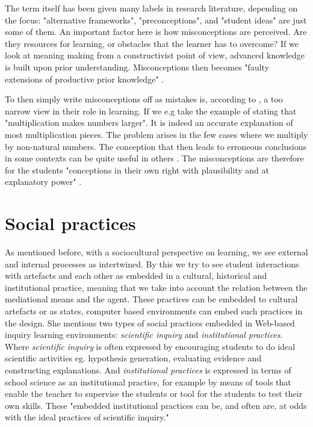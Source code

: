 The term itself has been given many labels in research literature, depending on the focus: "alternative frameworks", "preconceptions", and "student ideas" are just some of them. An important factor here is how misconceptions are perceived. Are they resources for learning, or obstacles that the learner has to overcome? If we look at meaning making from a constructivist point of view, advanced knowledge is built upon prior understanding. Misconceptions then becomes "faulty extensions of productive prior knowledge" \citep{smith1994misconceptions}.

To then simply write misconceptions off as mistakes is, according to \citet{smith1994misconceptions}, a too narrow view in their role in learning. If we e.g take the example of stating that "multiplication makes numbers larger". It is indeed an accurate explanation of most multiplication pieces. The problem arises in the few cases where we multiply by non-natural numbers. The conception that then leads to erroneous conclusions in some contexts can be quite useful in others \citep{smith1994misconceptions}. The misconceptions are therefore for the students "conceptions in their own right with plausibility and at explanatory power" \citetext{Smith, diSessa \& Roschelle 1993, referenced in \citealp{larkin2012misconceptions}}. 

\section{Social practices}
As mentioned before, with a sociocultural perspective on learning, we see external and internal processes as intertwined. By this we try to see student interactions with artefacts and each other as embedded in a cultural, historical and institutional practice, meaning that we take into account the relation between the mediational means and the agent. These practices can be embedded to cultural artefacts or as \citet{furberg2009socio} states, computer based environments can embed such practices in the design. She mentions two types of social practices embedded in Web-based inquiry learning environments: \emph{scientific inquiry} and \emph{institutional practices}.  Where \emph{scientific inquiry} is often expressed by encouraging students to do ideal scientific activities eg. hypothesis generation, evaluating evidence and constructing explanations. And \emph{institutional practices} is expressed in terms of school science as an institutional practice, for example by means of tools that enable the teacher to supervise the students or tool for the students to test their own skills. These "embedded institutional practices can be, and often are, at odds with the ideal practices of scientific inquiry." \citetext{Cinn \& Malhotra 2002, referenced in \citealp{furberg2009socio}} 

